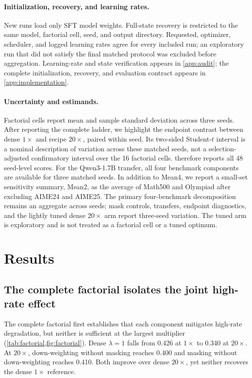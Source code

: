 \documentclass[5p,times]{elsarticle}
\begin{document}
\paragraph{Initialization, recovery, and learning rates.}
New runs load only SFT model weights. Full-state recovery is restricted to the
same model, factorial cell, seed, and output directory. Requested, optimizer,
scheduler, and logged learning rates agree for every included run; an
exploratory run that did not satisfy the final matched protocol was excluded
before aggregation.
Learning-rate and state verification appears in \ref{app:audit}; the complete
initialization, recovery, and evaluation contract appears in
\ref{app:implementation}.

\paragraph{Uncertainty and estimands.}
Factorial cells report mean and sample standard deviation across three seeds.
After reporting the complete ladder, we highlight the endpoint contrast
between dense $1\times$ and recipe $20\times$, paired within seed. Its
two-sided Student-$t$ interval is a nominal description of variation across
these matched seeds, not a selection-adjusted confirmatory interval over the 16
factorial cells.  therefore reports all 48 seed-level
scores.
For the Qwen3-1.7B transfer, all four benchmark components are available for
three matched seeds. In addition to Mean4, we report a small-set
sensitivity summary, Mean2, as the average of Math500 and Olympiad after
excluding AIME24 and AIME25. The primary four-benchmark decomposition remains
an aggregate across seeds; mask controls, transfers, endpoint diagnostics, and
the lightly tuned dense $20\times$ arm report three-seed variation. The tuned
arm is exploratory and is not treated as a factorial cell or a tuned optimum.

\section{Results}\label{sec:results}
\subsection{The complete factorial isolates the joint high-rate effect}
The complete factorial first establishes that each component mitigates
high-rate degradation, but neither is sufficient at the largest multiplier
(\cref{tab:factorial,fig:factorial}). Dense $\lambda=1$ falls from 0.426 at
$1\times$ to 0.340 at $20\times$. At $20\times$, down-weighting without
masking reaches 0.400 and masking without down-weighting reaches 0.410. Both
improve over dense $20\times$, yet neither recovers the dense $1\times$
reference.
\end{document}
